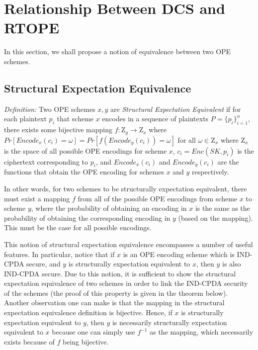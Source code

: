 \documentclass[12pt]{article}
\begin{document}
\section{Relationship Between DCS and RTOPE}

  In this section, we shall propose a notion of equivalence between two OPE schemes.

  \subsection{Structural Expectation Equivalence}

  \emph{Definition:} Two OPE schemes $x,y$ are \emph{Structural Expectation Equivalent} if for each plaintext $p_i$ that scheme $x$ encodes in a sequence of plaintexts $P = \{p_i\}_{i=1}^n$, there exists some bijective mapping $f: \mathrm{Z}_y \to \mathrm{Z}_x$ where $Pr[Encode_x(c_i) = \omega] = Pr[f(Encode_y(c_i)) = \omega]$ for all $\omega \in \mathrm{Z}_x$ where $\mathrm{Z}_x$ is the space of all possible OPE encodings for scheme $x$, $c_i = Enc(SK, p_i)$ is the ciphertext corresponding to $p_i$, and $Encode_x(c_i)$ and $Encode_y(c_i)$ are the functions that obtain the OPE encoding for schemes $x$ and $y$ respectively.

  In other words, for two schemes to be structurally expectation equivalent, there must exist a mapping $f$ from all of the possible OPE encodings from scheme $x$ to scheme $y$, where the probability of obtaining an encoding in $x$ is the same as the probability of obtaining the corresponding encoding in $y$ (based on the mapping). This must be the case for all possible encodings.

  This notion of structural expectation equivalence encompasses a number of useful features. In particular, notice that if $x$ is an OPE encoding scheme which is IND-CPDA secure, and $y$ is structurally expectation equivalent to $x$, then $y$ is also IND-CPDA secure. Due to this notion, it is sufficient to show the structural expectation equivalence of two schemes in order to link the IND-CPDA security of the schemes (the proof of this property is given in the theorem below). Another observation one can make is that the mapping in the structural expectation equivalence definition is bijective. Hence, if $x$ is structurally expectation equivalent to $y$, then $y$ is necessarily structurally expectation equivalent to $x$ because one can simply use $f^{-1}$ as the mapping, which necessarily exists because of $f$ being bijective.
\end{document}
